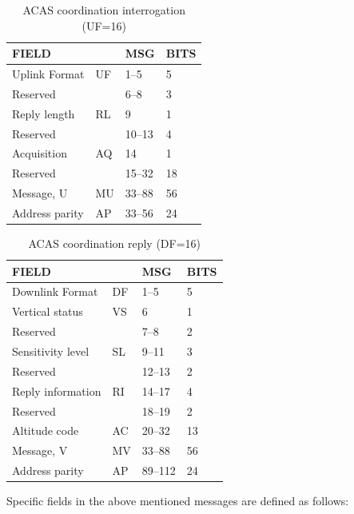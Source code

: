 \begin{table}[ht]
  \centering
  \caption{ACAS coordination interrogation (UF=16)}
  \label{tb:acas_uf_16}
  \begin{tabular}[t]{|l|l|l|l|}
  \hline
  \textbf{FIELD} & \textbf{} & \textbf{MSG} & \textbf{BITS} \\ \hline
  Uplink Format & UF & 1--5 & 5 \\ \hline
  Reserved &  & 6--8 & 3 \\ \hline
  Reply length & RL & 9 & 1 \\ \hline
  Reserved &  & 10--13 & 4 \\ \hline
  Acquisition & AQ & 14 & 1 \\ \hline
  Reserved &  & 15--32 & 18 \\ \hline
  Message, U & MU & 33--88 & 56 \\ \hline
  Address parity & AP & 33--56 & 24 \\ \hline
  \end{tabular}
\end{table}%

\begin{table}[ht]
  \centering
  \caption{ACAS coordination reply (DF=16)}
  \label{tb:acas_df_16}
  \begin{tabular}[t]{|l|l|l|l|}
  \hline
  \textbf{FIELD} & \textbf{} & \textbf{MSG} & \textbf{BITS} \\ \hline
  Downlink Format & DF & 1--5 & 5 \\ \hline
  Vertical status & VS & 6 & 1 \\ \hline
  Reserved &  & 7--8 & 2 \\ \hline
  Sensitivity level & SL & 9--11 & 3 \\ \hline
  Reserved &  & 12--13 & 2 \\ \hline
  Reply information & RI & 14--17 & 4 \\ \hline
  Reserved &  & 18--19 & 2 \\ \hline
  Altitude code & AC & 20--32 & 13 \\ \hline
  Message, V & MV & 33--88 & 56 \\ \hline
  Address parity & AP & 89--112 & 24 \\ \hline
  \end{tabular}
\end{table}


Specific fields in the above mentioned messages are defined as follows:

